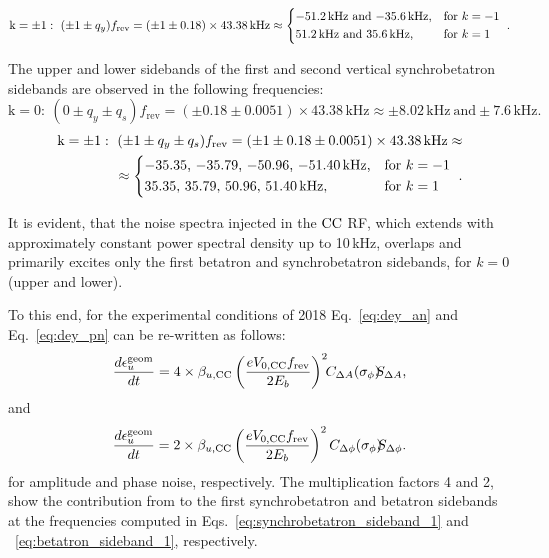\begin{equation}\label{eq:betatron_sideband_2}
   \mathrm{k= \pm 1}: \ (\pm 1 \pm q_y) f_\mathrm{rev} = (\pm 1 \pm 0.18) \times 43.38\mathrm{\,kHz} \approx \begin{dcases*} 
       \text{$-$51.2\,kHz and $-$35.6\,kHz,} & for  $k=-1$ \\ 
       \text{51.2\,kHz and 35.6\,kHz,} & for  $k=1$  
       \end{dcases*} .
\end{equation}

The upper and lower sidebands of the first and second vertical synchrobetatron sidebands are observed in the following frequencies:
\begin{equation}\label{eq:synchrobetatron_sideband_1}
    \mathrm{k=0}: \ (0 \pm q_y \pm q_s) f_\mathrm{rev} = (\pm 0.18 \pm 0.0051) \times 43.38\mathrm{\,kHz} \approx \pm 8.02\mathrm{\,kHz} \ \mathrm{ and } \pm 7.6\mathrm{\,kHz}.
\end{equation}
\begin{equation}\label{eq:synchrobetatron_sideband_2}
    \begin{split}
    \mathrm{k= \pm 1}: \ (\pm 1 \pm q_y \pm q_s) f_\mathrm{rev} = (\pm 1 \pm 0.18 \pm 0.0051)\times 43.38\mathrm{\,kHz} \approx \\ 
    \approx \begin{dcases*} 
        \text{$-$35.35, $-$35.79, $-$50.96, $-$51.40\,kHz,} & for  $k=-1$ \\ 
        \text{35.35, 35.79, 50.96, 51.40\,kHz,} & for  $k=1$  
        \end{dcases*} .
    \end{split}
\end{equation}

It is evident, that the noise spectra injected in the ${\mathrm{CC}}$ RF, which extends with approximately constant power spectral density up to 10\,kHz, overlaps and primarily excites only the first betatron and synchrobetatron sidebands, for $k=0$ (upper and lower).


To this end, for the experimental conditions of 2018 Eq.~\eqref{eq:dey_an} and Eq.~\eqref{eq:dey_pn} can be re-written as follows:
\begin{equation}\label{eq:dey_an_sps}
   \frac{d\epsilon^{\mathrm{geom}}_u}{dt}  = 4 \times \beta_{u, \mathrm{CC}} \left( \frac{e{V_\mathrm{0, CC}}{f_\mathrm{rev}}}{2E_b}\right)^2 \!\! C_{\Delta A} (\sigma_{\phi}) \!\! S_{\Delta A},
\end{equation}
and
\begin{equation}\label{eq:dey_pn_sps}
   \frac{d\epsilon^{\mathrm{geom}}_u}{dt}  = 2 \times \beta_{u, \mathrm{CC}}  \left( \frac{e{V_\mathrm{0, CC}}{f_\mathrm{rev}}}{2E_b}\right)^2 C_{\Delta \phi} (\sigma_{\phi}) \!\! S_{\Delta \phi}.
\end{equation}
for amplitude and phase noise, respectively. The multiplication factors 4 and 2, show the contribution from to the first synchrobetatron and betatron sidebands at the frequencies computed in Eqs.~\eqref{eq:synchrobetatron_sideband_1} and ~\eqref{eq:betatron_sideband_1}, respectively.

